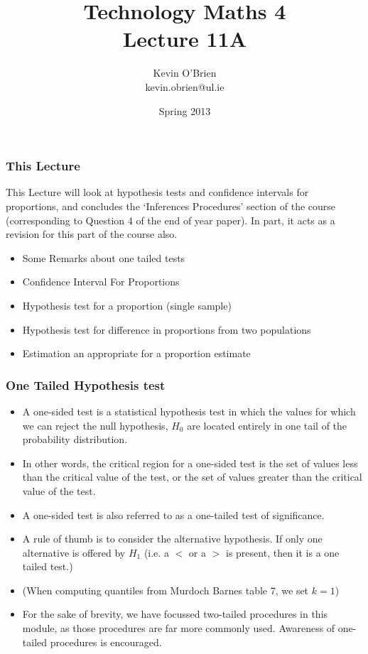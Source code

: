 \documentclass[a4]{beamer}
\title[MA4704]{Technology Maths 4 \\ {\normalsize Lecture 11A}}
\author[Kevin O'Brien]{Kevin O'Brien \\ {\scriptsize kevin.obrien@ul.ie}}
\date{Spring 2013}
\institute[Maths \& Stats]{Dept. of Mathematics \& Statistics, \\ University \textit{of} Limerick}
\begin{document}
\begin{frame}
\titlepage
\end{frame}



\begin{frame}
\frametitle{This Lecture}
This Lecture will look at hypothesis tests and confidence intervals for proportions, and concludes the `Inferences Procedures' section of the course (corresponding to Question 4 of the end of year paper). In part, it acts as a revision for this part of the course also.
\begin{itemize}
\item Some Remarks about one tailed tests
\item Confidence Interval For Proportions
\item Hypothesis test for a proportion (single sample)
\item Hypothesis test for difference in proportions from two populations
\item Estimation an appropriate for a proportion estimate
\end{itemize}
\end{frame}

\begin{frame}
\frametitle{One Tailed Hypothesis test}
\begin{itemize}
\item A one-sided test is a statistical hypothesis test in which the values for which we can reject the null hypothesis, $H_0$ are located entirely in one tail of the probability distribution.

\item In other words, the critical region for a one-sided test is the set of values less than the critical value of the test, or the set of values greater than the critical value of the test.

\item A one-sided test is also referred to as a one-tailed test of significance.

\item A rule of thumb is to consider the alternative hypothesis.  If only one alternative is offered by $H_1$ (i.e. a $<$ or a $>$ is present, then it is a one tailed test.)
\item (When computing quantiles from Murdoch Barnes table 7, we set $k=1$)
\item For the sake of brevity, we have focussed two-tailed procedures in this module, as those procedures are far more commonly used. Awareness of one-tailed procedures is encouraged.
\end{itemize}
\end{frame}
\end{document}
